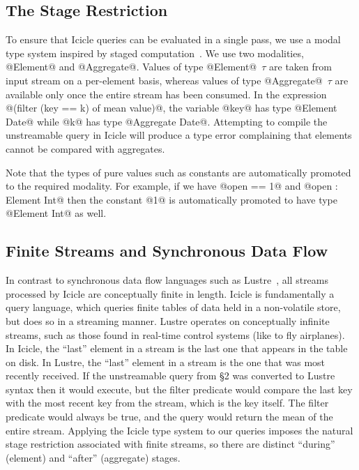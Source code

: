 \subsection{The Stage Restriction}
To ensure that Icicle queries can be evaluated in a single pass, we use a modal type system inspired by staged computation~\cite{davies2001modal}. We use two modalities, @Element@ and @Aggregate@. Values of type @Element@~$\tau$ are taken from input stream on a per-element basis, whereas values of type @Aggregate@~$\tau$ are available only once the entire stream has been consumed. In the expression @(filter (key == k) of mean value)@, the variable @key@ has type @Element Date@ while @k@ has type @Aggregate Date@. Attempting to compile the unstreamable query in Icicle will produce a type error complaining that elements cannot be compared with aggregates.

Note that the types of pure values such as constants are automatically promoted to the required modality. For example, if we have @open == 1@ and @open : Element Int@ then the constant @1@ is automatically promoted to have type @Element Int@ as well.


\subsection{Finite Streams and Synchronous Data Flow}
In contrast to synchronous data flow languages such as {\sc Lustre}~\cite{halbwachs1991synchronous}, all streams processed by Icicle are conceptually finite in length. Icicle is fundamentally a query language, which queries finite tables of data held in a non-volatile store, but does so in a streaming manner. Lustre operates on conceptually infinite streams, such as those found in real-time control systems (like to fly airplanes). In Icicle, the ``last'' element in a stream is the last one that appears in the table on disk. In Lustre, the ``last'' element in a stream is the one that was most recently received. If the unstreamable query from \S2 was converted to Lustre syntax then it would execute, but the filter predicate would compare the last key with the most recent key from the stream, which is the key itself. The filter predicate would always be true, and the query would return the mean of the entire stream. Applying the Icicle type system to our queries imposes the natural stage restriction associated with finite streams, so there are distinct ``during'' (element) and ``after'' (aggregate) stages.


